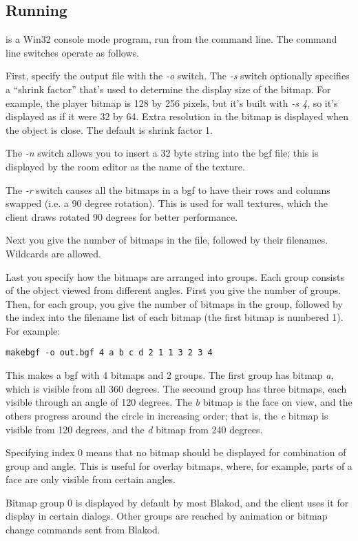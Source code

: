 \subsection{Running \makebgf}

\makebgf is a Win32 console mode program, run from the command line.
The command line switches operate as follows.

First, specify the output file with the {\em -o} switch.  The {\em -s}
switch optionally specifies a ``shrink factor'' that's used to
determine the display size of the bitmap.  For example, the player
bitmap is 128 by 256 pixels, but it's built with {\em -s 4}, so it's
displayed as if it were 32 by 64.  Extra resolution in the bitmap is
displayed when the object is close.  The default is shrink factor 1.

The {\em -n} switch allows you to insert a 32 byte string into the bgf
file; this is displayed by the room editor as the name of the texture.

The {\em -r} switch causes all the bitmaps in a bgf to have their rows
and columns swapped (i.e. a 90 degree rotation).  This is used for
wall textures, which the client draws rotated 90 degrees for better
performance.

Next you give the number of bitmaps in the file, followed by their
filenames.  Wildcards are allowed.

Last you specify how the bitmaps are arranged into groups.  Each group
consists of the object viewed from different angles.  First you give
the number of groups.  Then, for each group, you give the number of
bitmaps in the group, followed by the index into the filename list of
each bitmap (the first bitmap is numbered 1).  For example:

{\tt makebgf -o out.bgf 4 a b c d 2  1 1  3 2 3 4}

\noindent
This makes a bgf with 4 bitmaps and 2 groups.  The first group has
bitmap {\em a}, which is visible from all 360 degrees.  The secound
group has three bitmaps, each visible through an angle of 120 degrees.
The {\em b} bitmap is the face on view, and the others progress around
the circle in increasing order; that is, the {\em c} bitmap is visible
from 120 degrees, and the {\em d} bitmap from 240 degrees.

Specifying index 0 means that no bitmap should be displayed for
combination of group and angle.  This is useful for overlay bitmaps,
where, for example, parts of a face are only visible from certain angles.

Bitmap group 0 is displayed by default by most Blakod, and the client
uses it for display in certain dialogs.  Other groups are reached
by animation or bitmap change commands sent from Blakod.

